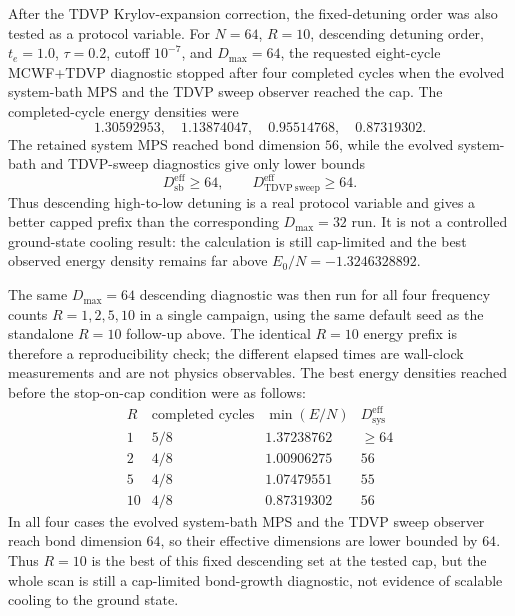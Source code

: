 \documentclass[aps,pra,twocolumn,superscriptaddress,nolongbibliography,nobalancelastpage,10pt]{revtex4-2}
\begin{document}
After the TDVP Krylov-expansion correction, the fixed-detuning order was also
tested as a protocol variable.  For \(N=64\), \(R=10\), descending detuning
order, \(t_e=1.0\), \(\tau=0.2\), cutoff \(10^{-7}\), and
\(D_{\max}=64\), the requested eight-cycle MCWF+TDVP diagnostic stopped after
four completed cycles when the evolved system-bath MPS and the TDVP sweep
observer reached the cap.  The completed-cycle energy densities were
\[
	1.30592953,\quad 1.13874047,\quad 0.95514768,\quad 0.87319302 .
\]
The retained system MPS reached bond dimension \(56\), while the evolved
system-bath and TDVP-sweep diagnostics give only lower bounds
\[
	D_{\mathrm{sb}}^{\mathrm{eff}}\geq 64,\qquad
	D_{\mathrm{TDVP\ sweep}}^{\mathrm{eff}}\geq 64 .
\]
Thus descending high-to-low detuning is a real protocol variable and gives a
better capped prefix than the corresponding \(D_{\max}=32\) run.  It is not a
controlled ground-state cooling result: the calculation is still cap-limited
and the best observed energy density remains far above
\(E_0/N=-1.3246328892\).

The same \(D_{\max}=64\) descending diagnostic was then run for all four
frequency counts \(R=1,2,5,10\) in a single campaign, using the same default
seed as the standalone \(R=10\) follow-up above.  The identical \(R=10\) energy
prefix is therefore a reproducibility check; the different elapsed times are
wall-clock measurements and are not physics observables.  The best energy
densities reached before the stop-on-cap condition were as follows:
\[
\begin{array}{c|c|c|c}
R & \text{completed cycles} & \min(E/N) & D_{\mathrm{sys}}^{\mathrm{eff}}\\
\hline
1 & 5/8 & 1.37238762 & \geq 64\\
2 & 4/8 & 1.00906275 & 56\\
5 & 4/8 & 1.07479551 & 55\\
10 & 4/8 & 0.87319302 & 56
\end{array}
\]
In all four cases the evolved system-bath MPS and the TDVP sweep observer reach
bond dimension \(64\), so their effective dimensions are lower bounded by
\(64\).  Thus \(R=10\) is the best of this fixed descending set at the
tested cap, but the whole scan is still a cap-limited bond-growth diagnostic,
not evidence of scalable cooling to the ground state.
\end{document}
